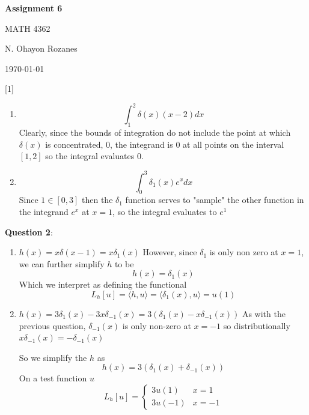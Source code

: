 \documentclass{article} %
\newcommand{\question}[2][]{
  \begin{flushleft}
    \textbf{Question #1}: \textit{#2}

\end{flushleft}}
\newcommand{\maketitletwo}[2][]{
  \begin{center}
    \Large{\textbf{Assignment #1}

    MATH 4362} %
    \vspace{5pt}

    \normalsize{N. Ohayon Rozanes  %

    \today}        %
    \vspace{15pt}

\end{center}}
\begin{document}
\maketitletwo[6]  %

\question[1]{}
\begin{enumerate}
  \item
    \[
      \int_1^2 \delta(x)(x-2)dx
    \]
    Clearly, since the bounds of integration do not include the point
    at which $\delta(x)$ is concentrated, $0$, the integrand is $0$
    at all points on the interval $[1,2]$ so the integral evaluates $0$.
  \item
    \[
      \int_0^3 \delta_1(x)e^x dx
    \]
    Since $1 \in [0,3]$ then the $\delta_1$ function serves to
    "sample" the other function in the integrand $e^x$ at $x = 1$, so
    the integral evaluates to $e^1$
\end{enumerate}

\question[2]{}

\begin{enumerate}
  \item $h(x) = x\delta(x-1) = x\delta_1(x)$
    However, since $\delta_1$ is only non zero at $x=1$, we can
    further simplify $h$ to be
    \[
      h(x) = \delta_1(x)
    \]
    Which we interpret as defining the functional
    \[
      L_h[u] = \langle h, u \rangle = \langle \delta_1(x), u \rangle
      = u(1)
    \]
  \item
    $h(x) = 3\delta_1(x) - 3x\delta_{-1}(x) = 3(\delta_1(x) - x\delta_{-1}(x))$
    As with the previous question, $\delta_{-1}(x)$ is only non-zero
    at $x=-1$ so distributionally $x\delta_{-1}(x) = -\delta_{-1}(x)$

    So we simplify the $h$ as
    \[
      h(x) = 3(\delta_1(x) + \delta_{-1}(x))
    \]
    On a test function $u$
    \[
      L_h[u] =
      \begin{cases}
        3u(1) & x = 1\\
        3u(-1) & x = -1
      \end{cases}
    \]
\end{enumerate}
\end{document}
